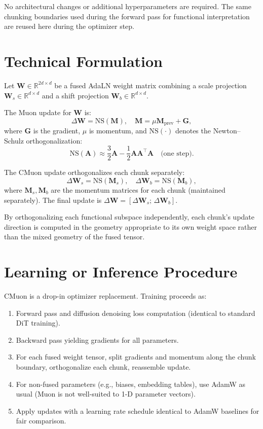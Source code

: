 \documentclass[10pt,twocolumn]{article}
\begin{document}
No architectural changes or additional hyperparameters are required. The same chunking
boundaries used during the forward pass for functional interpretation are reused here
during the optimizer step.

\section{Technical Formulation}

Let $\mathbf{W} \in \mathbb{R}^{2d \times d}$ be a fused AdaLN weight matrix
combining a scale projection $\mathbf{W}_s \in \mathbb{R}^{d \times d}$ and a
shift projection $\mathbf{W}_b \in \mathbb{R}^{d \times d}$.

The Muon update for $\mathbf{W}$ is:
\[
\Delta\mathbf{W} = \mathrm{NS}(\mathbf{M}),
\quad
\mathbf{M} = \mu \mathbf{M}_{\mathrm{prev}} + \mathbf{G},
\]
where $\mathbf{G}$ is the gradient, $\mu$ is momentum, and
$\mathrm{NS}(\cdot)$ denotes the Newton--Schulz orthogonalization:
\[
\mathrm{NS}(\mathbf{A}) \approx \frac{3}{2}\mathbf{A} - \frac{1}{2}\mathbf{A}\mathbf{A}^\top\mathbf{A}
\quad \text{(one step)}.
\]

The CMuon update orthogonalizes each chunk separately:
\[
\Delta\mathbf{W}_s = \mathrm{NS}(\mathbf{M}_s), \quad
\Delta\mathbf{W}_b = \mathrm{NS}(\mathbf{M}_b),
\]
where $\mathbf{M}_s, \mathbf{M}_b$ are the momentum matrices for each chunk
(maintained separately). The final update is $\Delta\mathbf{W} =
[\Delta\mathbf{W}_s;\,\Delta\mathbf{W}_b]$.

By orthogonalizing each functional subspace independently, each chunk's update
direction is computed in the geometry appropriate to its own weight space rather
than the mixed geometry of the fused tensor.

\section{Learning or Inference Procedure}

CMuon is a drop-in optimizer replacement. Training proceeds as:
\begin{enumerate}[itemsep=2pt,parsep=0pt]
  \item Forward pass and diffusion denoising loss computation (identical to standard
    DiT training).
  \item Backward pass yielding gradients for all parameters.
  \item For each fused weight tensor, split gradients and momentum along the chunk
    boundary, orthogonalize each chunk, reassemble update.
  \item For non-fused parameters (e.g., biases, embedding tables), use AdamW as usual
    (Muon is not well-suited to 1-D parameter vectors).
  \item Apply updates with a learning rate schedule identical to AdamW baselines
    for fair comparison.
\end{enumerate}
\end{document}
